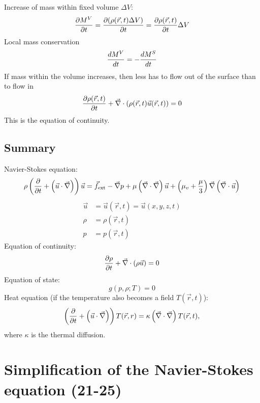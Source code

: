 Increase of mass within fixed volume $\Delta V$:
\begin{equation}
\frac{\partial M^V}{\partial t} = \frac{\partial (\rho(\vec{r},t)\Delta V)}{\partial t} = \frac{\partial \rho(\vec{r},t)}{\partial t}\Delta V
\end{equation}
Local mass conservation
\begin{equation}
\frac{d M^V}{d t} = -\frac{d M^S}{d t}
\end{equation}
If mass within the volume increases, then less has to flow out of the surface than to flow in
\begin{equation}
\frac{\partial \rho(\vec{r},t)}{\partial t}+\vec{\nabla}\cdot\left(\rho(\vec{r},t)\vec{u}(\vec{r},t)\right)=0
\end{equation}
This is the equation of continuity.


\subsection{Summary}
Navier-Stokes equation:
\begin{equation}\label{eq:navier-stokes}
\rho\left(\frac{\partial }{\partial t}+\left(\vec{u}\cdot\vec{\nabla}\right)\right)\vec{u} = \vec{f} _\mathrm{ext}-\vec{\nabla}p+\mu\left(\vec{\nabla}\cdot\vec{\nabla}\right)\vec{u} + \left(\mu_v + \frac{\mu}{3}\right)\vec{\nabla}\left(\vec{\nabla}\cdot\vec{u}\right)
\end{equation}
\begin{align}
\vec{u} &= \vec{u}(\vec{r},t) = \vec{u}(x,y,z,t) \\
\rho &= \rho(\vec{r},t)\\
p &= p(\vec{r},t)
\end{align}
Equation of continuity:
\begin{equation}
\frac{\partial \rho}{\partial t}+\vec{\nabla}\cdot(\rho\vec{u})=0
\end{equation}
Equation of state:
\begin{equation}
g(p,\rho;T)=0
\end{equation}
Heat equation (if the temperature also becomes a field $T(\vec{r},t)$):
\begin{equation}
\left(\frac{\partial }{\partial t}+\left(\vec{u}\cdot\vec{\nabla}\right)\right)T(\vec{r},r) = \kappa\left(\vec{\nabla}\cdot\vec{\nabla}\right)T(\vec{r},t),
\end{equation}
where $\kappa$ is the thermal diffusion.

\newpage
\section{Simplification of the Navier-Stokes equation (21-25)}


